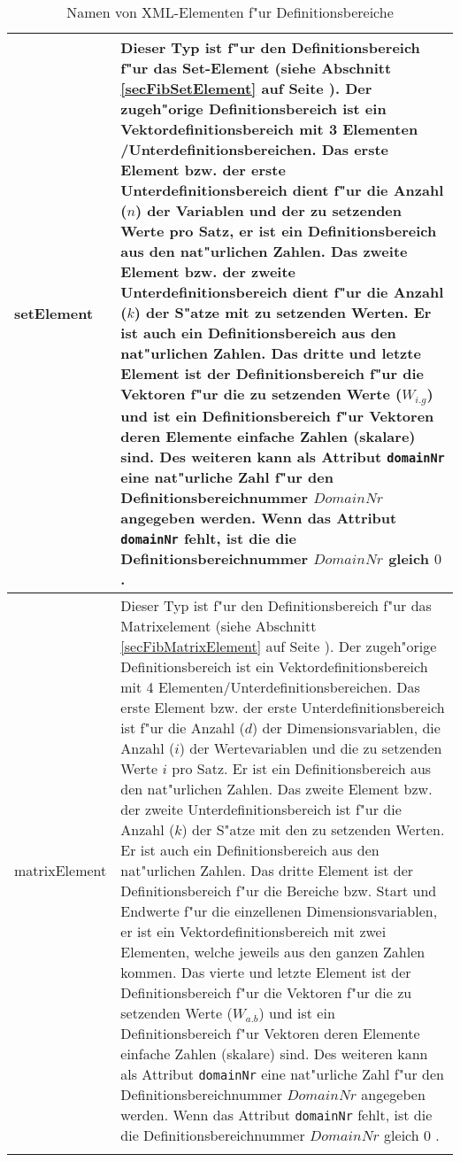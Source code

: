 \begin{center}
\begin{longtable}{|p{25mm}|p{100mm}|}
	setElement & Dieser Typ ist f"ur den Definitionsbereich f"ur das Set-Element (siehe Abschnitt \ref{secFibSetElement} auf Seite \pageref{secFibSetElement}). Der zugeh"orige Definitionsbereich ist ein Vektordefinitionsbereich mit 3 Elementen /Unterdefinitionsbereichen. Das erste Element bzw. der erste Unterdefinitionsbereich dient f"ur die Anzahl ($n$) der Variablen und der zu setzenden Werte pro Satz, er ist ein Definitionsbereich aus den nat"urlichen Zahlen. Das zweite Element bzw. der zweite Unterdefinitionsbereich dient f"ur die Anzahl ($k$) der S"atze mit zu setzenden Werten. Er ist auch ein Definitionsbereich aus den nat"urlichen Zahlen. Das dritte und letzte Element ist der Definitionsbereich f"ur die Vektoren f"ur die zu setzenden Werte ($W_{i.g}$) und ist ein Definitionsbereich f"ur Vektoren deren Elemente einfache Zahlen (skalare) sind. Des weiteren kann als Attribut \verb|domainNr| eine nat"urliche Zahl f"ur den Definitionsbereichnummer $DomainNr$ angegeben werden. Wenn das Attribut \verb|domainNr| fehlt, ist die die Definitionsbereichnummer $DomainNr$ gleich $0$ . \\\hline
	matrixElement & Dieser Typ ist f"ur den Definitionsbereich f"ur das Matrixelement (siehe Abschnitt \ref{secFibMatrixElement} auf Seite \pageref{secFibMatrixElement}). Der zugeh"orige Definitionsbereich ist ein Vektordefinitionsbereich mit 4 Elementen/Unterdefinitionsbereichen. Das erste Element bzw. der erste Unterdefinitionsbereich ist f"ur die Anzahl ($d$) der Dimensionsvariablen, die Anzahl ($i$) der Wertevariablen und die zu setzenden Werte $i$ pro Satz. Er ist ein Definitionsbereich aus den nat"urlichen Zahlen. Das zweite Element bzw. der zweite Unterdefinitionsbereich ist f"ur die Anzahl ($k$) der S"atze mit den zu setzenden Werten. Er ist auch ein Definitionsbereich aus den nat"urlichen Zahlen. Das dritte Element ist der Definitionsbereich f"ur die Bereiche bzw. Start und Endwerte f"ur die einzellenen Dimensionsvariablen, er ist ein Vektordefinitionsbereich mit zwei Elementen, welche jeweils aus den ganzen Zahlen kommen. Das vierte und letzte Element ist der Definitionsbereich f"ur die Vektoren f"ur die zu setzenden Werte ($W_{a.b}$) und ist ein Definitionsbereich f"ur Vektoren deren Elemente einfache Zahlen (skalare) sind. Des weiteren kann als Attribut \verb|domainNr| eine nat"urliche Zahl f"ur den Definitionsbereichnummer $DomainNr$ angegeben werden. Wenn das Attribut \verb|domainNr| fehlt, ist die die Definitionsbereichnummer $DomainNr$ gleich $0$ .\\\hline

\caption{Namen von XML-Elementen f"ur Definitionsbereiche}
\label{tableFixXmlElementsForDefinitionRanges}
\end{longtable}
\end{center}


